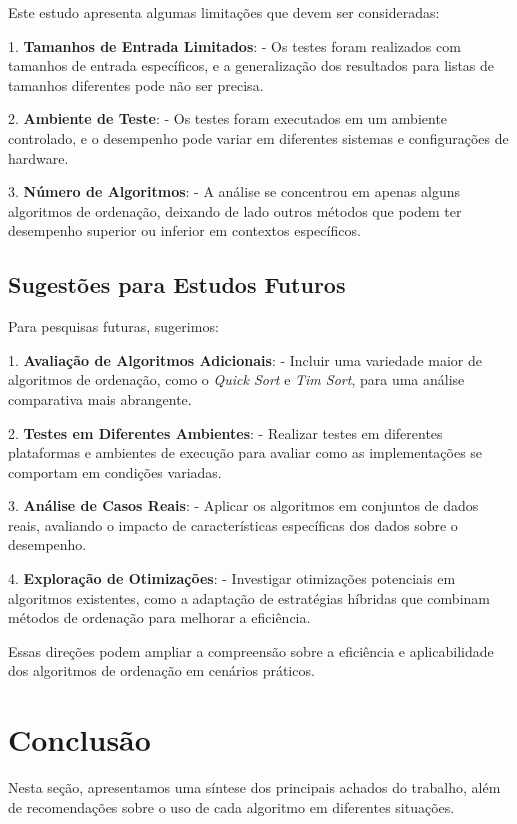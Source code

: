 \documentclass[a4paper,12pt]{article}
\begin{document}
Este estudo apresenta algumas limitações que devem ser consideradas:

1. \textbf{Tamanhos de Entrada Limitados}: 
   - Os testes foram realizados com tamanhos de entrada específicos, e a generalização dos resultados para listas de tamanhos diferentes pode não ser precisa.

2. \textbf{Ambiente de Teste}: 
   - Os testes foram executados em um ambiente controlado, e o desempenho pode variar em diferentes sistemas e configurações de hardware.

3. \textbf{Número de Algoritmos}: 
   - A análise se concentrou em apenas alguns algoritmos de ordenação, deixando de lado outros métodos que podem ter desempenho superior ou inferior em contextos específicos.

\subsection{Sugestões para Estudos Futuros}

Para pesquisas futuras, sugerimos:

1. \textbf{Avaliação de Algoritmos Adicionais}: 
   - Incluir uma variedade maior de algoritmos de ordenação, como o \textit{Quick Sort} e \textit{Tim Sort}, para uma análise comparativa mais abrangente.

2. \textbf{Testes em Diferentes Ambientes}: 
   - Realizar testes em diferentes plataformas e ambientes de execução para avaliar como as implementações se comportam em condições variadas.

3. \textbf{Análise de Casos Reais}: 
   - Aplicar os algoritmos em conjuntos de dados reais, avaliando o impacto de características específicas dos dados sobre o desempenho.

4. \textbf{Exploração de Otimizações}: 
   - Investigar otimizações potenciais em algoritmos existentes, como a adaptação de estratégias híbridas que combinam métodos de ordenação para melhorar a eficiência.

Essas direções podem ampliar a compreensão sobre a eficiência e aplicabilidade dos algoritmos de ordenação em cenários práticos.


\section{Conclusão}

Nesta seção, apresentamos uma síntese dos principais achados do trabalho, além de recomendações sobre o uso de cada algoritmo em diferentes situações.
\end{document}
